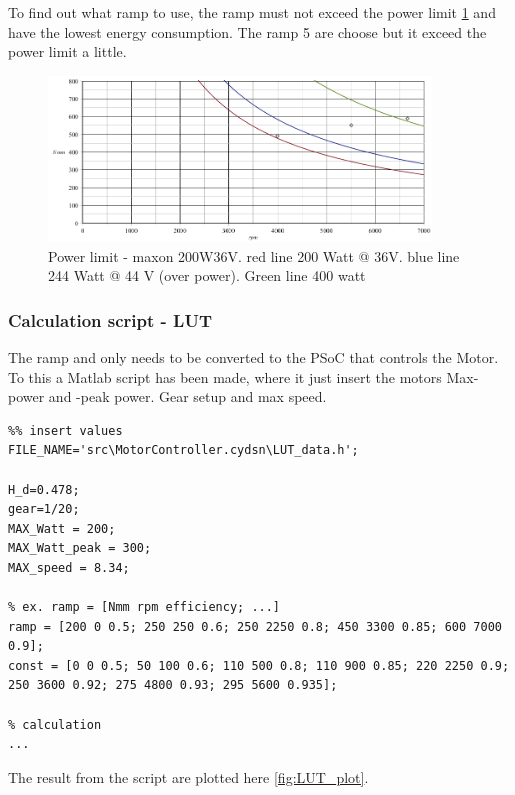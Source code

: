 To find out what ramp to use, the ramp must not exceed the power limit \ref{fig:eff_maxon_36V_Power_limit} and have the lowest energy consumption. The ramp 5 are choose but it exceed the power limit a little.

\begin{figure}[H]
	\centering
	\includegraphics [width=4in]{Software/Pictures/Power_limit.PNG}
	\caption{Power limit - maxon 200W36V. red line 200 Watt @ 36V. blue line 244 Watt @ 44 V (over power). Green line 400 watt}
	\label{fig:eff_maxon_36V_Power_limit}
\end{figure}

\subsubsection{Calculation script - LUT}

The ramp and only needs to be converted to the PSoC that controls the Motor. To this a Matlab script has been made, where it just insert the motors Max-power and -peak power. Gear setup and max speed.    
\lstset{language=matlab}
\begin{lstlisting}
%% insert values
FILE_NAME='src\MotorController.cydsn\LUT_data.h';

H_d=0.478;
gear=1/20;
MAX_Watt = 200;
MAX_Watt_peak = 300;
MAX_speed = 8.34;

% ex. ramp = [Nmm rpm efficiency; ...]
ramp = [200 0 0.5; 250 250 0.6; 250 2250 0.8; 450 3300 0.85; 600 7000 0.9];
const = [0 0 0.5; 50 100 0.6; 110 500 0.8; 110 900 0.85; 220 2250 0.9; 250 3600 0.92; 275 4800 0.93; 295 5600 0.935];

% calculation
...

\end{lstlisting}

The result from the script are plotted here \ref{fig:LUT_plot}. 

